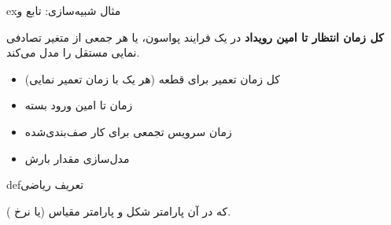 \begin{PSbox}[breakable]{ex}{مثال شبیه‌سازی: تابع  و }
\begin{Shaded}
\begin{Highlighting}[]
\OperatorTok{;}
\NormalTok{(}\OperatorTok{,} \OperatorTok{,} \OperatorTok{,} \OperatorTok{,} \NormalTok{)}\OperatorTok{;}
 \OperatorTok{;}
\NormalTok{(}\OperatorTok{,} \OperatorTok{,} \OperatorTok{,} \OperatorTok{,} \NormalTok{)}\OperatorTok{;}
\NormalTok{(}\NormalTok{)}\OperatorTok{;} \NormalTok{(}\NormalTok{)}\OperatorTok{;}
\NormalTok{(}\NormalTok{)}\OperatorTok{;}
\NormalTok{(}\OperatorTok{,} \NormalTok{)}\OperatorTok{;}
 \OperatorTok{;}
\end{Highlighting}
\end{Shaded}

\end{PSbox}



\textbf{کل زمان انتظار تا امین رویداد} در یک فرایند پواسون، یا هر جمعی از  متغیر تصادفی نمایی مستقل را مدل می‌کند.


\begin{itemize}
\tightlist
\item
  کل زمان تعمیر برای  قطعه (هر یک با زمان تعمیر نمایی)
\item
  زمان تا امین ورود بسته
\item
  زمان سرویس تجمعی برای  کار صف‌بندی‌شده
\item
  مدل‌سازی مقدار بارش
\end{itemize}

\begin{PSbox}[unbreakable]{def}{تعریف ریاضی}

 که در آن \lr{\ensuremath{\alpha} =} پارامتر شکل و \lr{\ensuremath{\beta} =} پارامتر مقیاس (یا نرخ ).

\end{PSbox}

